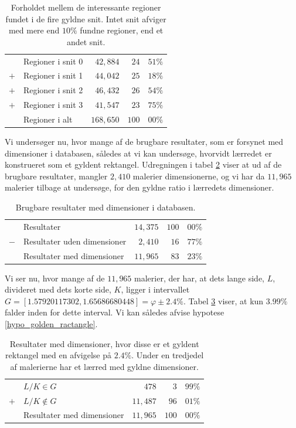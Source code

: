 {\begin{table}[H]
    \centering
    \begin{tabular}{r@{\ \ }p{12em}r|r@{.}l}
            & Regioner i snit 0   &  $42,884$ &  $24$ & $51\%$ \\
        $+$ & Regioner i snit 1   &  $44,042$ &  $25$ & $18\%$ \\
        $+$ & Regioner i snit 2   &  $46,432$ &  $26$ & $54\%$ \\
        $+$ & Regioner i snit 3   &  $41,547$ &  $23$ & $75\%$ \\\hline
            & Regioner i alt      & $168,650$ & $100$ & $00\%$
    \end{tabular}
    \caption[]{Forholdet mellem de interessante regioner fundet i de
    fire gyldne snit. Intet snit afviger med mere end $10\%$ fundne
    regioner, end et andet snit.}
    \label{tabel_fire_snit}
\end{table}

Vi undersøger nu, hvor mange af de brugbare resultater, som er forsynet
med dimensioner i databasen, således at vi kan undersøge, hvorvidt
lærredet er konstrueret som et gyldent rektangel. Udregningen i tabel
\ref{tabel_med_dimensioner} viser at ud af de brugbare resultater,
mangler $2,410$ malerier dimensionerne, og vi har da $11,965$ malerier
tilbage at undersøge, for den gyldne ratio i lærredets dimensioner.

\begin{table}[H]
    \centering
    \begin{tabular}{r@{\ \ }p{14em}r|r@{.}l}
            & Resultater                     & $14,375$ & $100$ & $00\%$ \\
        $-$ & Resultater uden dimensioner    &  $2,410$ &  $16$ & $77\%$ \\\hline
            & Resultater med dimensioner     & $11,965$ &  $83$ & $23\%$
    \end{tabular}
    \caption[]{Brugbare resultater med dimensioner i databasen.}
    \label{tabel_med_dimensioner}
\end{table}

Vi ser nu, hvor mange af de $11,965$ malerier, der har, at dets lange
side, $L$, divideret med dets korte side, $K$, ligger i intervallet $G =
[1.57920117302, 1.65686680448] = \varphi \pm 2.4\%$. Tabel
\ref{tabel_real_dimensions} viser, at kun $3.99\%$ falder inden for
dette interval. Vi kan således afvise hypotese
\ref{hypo_golden_ractangle}.

\begin{table}[H]
    \centering
    \begin{tabular}{r@{\ \ }p{14em}r|r@{.}l}
            & $L/K \in G$                  &    $478$ &   $3$ & $99\%$ \\
        $+$ & $L/K \notin G$               & $11,487$ &  $96$ & $01\%$ \\\hline
            & Resultater med dimensioner   & $11,965$ & $100$ & $00\%$
    \end{tabular}
    \caption[]{Resultater med dimensioner, hvor disse er et gyldent
    rektangel med en afvigelse på $2.4\%$. Under en tredjedel af
    malerierne har et lærred med gyldne dimensioner.}
    \label{tabel_real_dimensions}
\end{table}

}
